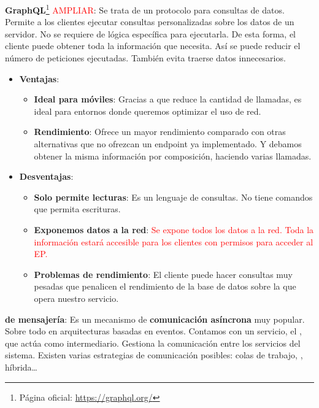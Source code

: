 \textbf{GraphQL}\footnote{Página oficial: \url{https://graphql.org/}} \textcolor{red}{AMPLIAR}: Se trata de un protocolo para consultas de datos. Permite a los clientes ejecutar consultas personalizadas sobre los datos de un servidor. No se requiere de lógica específica para ejecutarla. De esta forma, el cliente puede obtener toda la información que necesita. Así se puede reducir el número de peticiones ejecutadas. También evita traerse datos innecesarios.

\begin{itemize}
  \item \textbf{Ventajas}:

  \begin{itemize}
    \item \textbf{Ideal para móviles}: Gracias a que reduce la cantidad de llamadas, es ideal para entornos donde queremos optimizar el uso de red.

    \item \textbf{Rendimiento}: Ofrece un mayor rendimiento comparado con otras alternativas que no ofrezcan un endpoint ya implementado. Y debamos obtener la misma información por composición, haciendo varias llamadas.
  \end{itemize}

  \item \textbf{Desventajas}:

  \begin{itemize}
    \item \textbf{Solo permite lecturas}: Es un lenguaje de consultas. No tiene comandos que permita escrituras.

    \item \textbf{Exponemos datos a la red}: \textcolor{red}{Se expone todos los datos a la red. Toda la información estará accesible para los clientes con permisos para acceder al EP.}

    \item \textbf{Problemas de rendimiento}: El cliente puede hacer consultas muy pesadas que penalicen el rendimiento de la base de datos sobre la que opera nuestro servicio.
  \end{itemize}
\end{itemize}

\textbf{ de mensajería}: Es un mecanismo de \textbf{comunicación asíncrona} muy popular. Sobre todo en arquitecturas basadas en eventos. Contamos con un servicio, el , que actúa como intermediario. Gestiona la comunicación entre los servicios del sistema. \cite{newmanBuildingMicroservicesDesigning2021} Existen varias estrategias de comunicación posibles: colas de trabajo, , híbrida\dots

